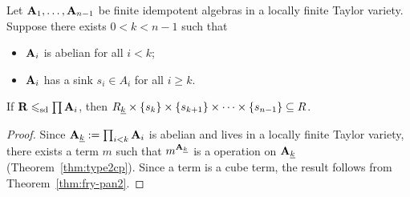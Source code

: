 \begin{corollary}
\label{cor:fry-pan}
  Let $\mathbf{A}_1, \dots, \mathbf{A}_{n-1}$ be finite idempotent algebras in a
  locally finite Taylor variety. 
  Suppose there exists $0< k < n-1$ such that 
  \begin{itemize}
  \item $\mathbf{A}_i$ is abelian for all $i < k$;
  \item $\mathbf{A}_i$ has a sink $s_i \in A_i$ for all $i \geq k$.
  \end{itemize}
  If $\mathbf{R} \leqslant_{\mathrm{sd}} \prod \mathbf{A}_i$, then
  $R_{\underline{k}} \times \{s_k\} \times \{s_{k+1}\} \times \cdots \times \{s_{n-1}\}  \subseteq R$.
\end{corollary}
\begin{proof}
  Since $\mathbf{A}_{\underline{k}} := \prod_{i<k} \mathbf{A}_i$ is abelian and lives in a locally finite
  Taylor variety, there exists a term $m$ such that $m^{\mathbf{A}_{\underline{k}}}$ is a \malcev
  operation on $\mathbf{A}_{\underline{k}}$ (Theorem~\ref{thm:type2cp}).  %
  Since a \malcev term is a cube term, the result follows from Theorem~\ref{thm:fry-pan2}.
\end{proof}





























